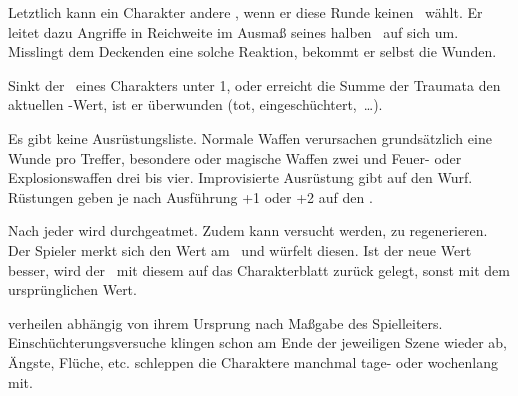 {		Letztlich kann ein Charakter andere , wenn er diese Runde keinen \AD\ wählt. Er leitet dazu Angriffe in Reichweite im Ausmaß seines halben \RD\ auf sich um. Misslingt dem Deckenden eine solche Reaktion, bekommt er selbst die Wunden.

		Sinkt der \HD\ eines Charakters unter 1, oder erreicht die Summe der Traumata den aktuellen \HD-Wert, ist er überwunden (tot, eingeschüchtert,~\ldots).


		\noindent
		Es gibt keine Ausrüstungsliste. Normale Waffen verursachen grundsätzlich eine Wunde pro Treffer, besondere oder magische Waffen zwei und Feuer- oder Explosionswaffen drei bis vier. Improvisierte Ausrüstung gibt  auf den Wurf. Rüstungen geben je nach Ausführung +1 oder +2 auf den \RD.


		\noindent
		Nach jeder  wird durchgeatmet. Zudem kann versucht werden, zu regenerieren. Der Spieler merkt sich den Wert am \HD\ und würfelt diesen. Ist der neue Wert besser, wird der \HD\ mit diesem auf das Charakterblatt zurück gelegt, sonst mit dem ursprünglichen Wert.

		 verheilen abhängig von ihrem Ursprung nach Maßgabe des Spielleiters. Einschüchterungsversuche klingen schon am Ende der jeweiligen Szene wieder ab, Ängste, Flüche, etc. schleppen die Charaktere manchmal tage- oder wochenlang mit.
}


